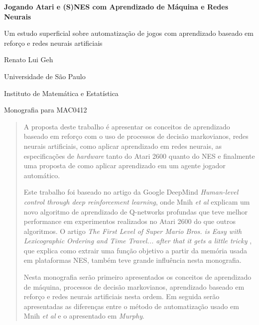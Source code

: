 \documentclass[a4paper,10pt]{article}
\theoremstyle{plain}
\begin{document}
\begin{titlepage}
  \begin{center}
    \LARGE
    \textbf{Jogando Atari e (S)NES com Aprendizado de Máquina e Redes Neurais}

    \vspace{1.7cm}
    \Large
    Um estudo superficial sobre automatização de jogos com aprendizado baseado em reforço e
    redes neurais artificiais

    \vspace{1.7cm}
    \Large
    Renato Lui Geh

    \vfill
    \Large
    Universidade de São Paulo

    Instituto de Matemática e Estatística

    Monografia para MAC0412
    \vspace{1.5cm}
  \end{center}
\end{titlepage}

\newpage
\null\vspace{\fill}
\begin{abstract}
  \large
  A proposta deste trabalho é apresentar os conceitos de aprendizado baseado em reforço com o uso
  de processos de decisão markovianos, redes neurais artificiais, como aplicar aprendizado em redes
  neurais, as especificações de \textit{hardware} tanto do Atari 2600 quanto do NES e finalmente
  uma proposta de como aplicar aprendizado em um agente jogador automático.

  Este trabalho foi baseado no artigo da Google DeepMind \textit{Human-level control through deep
  reinforcement learning}\cite{mnih-et-al}, onde Mnih \textit{et al} explicam um novo algoritmo de
  aprendizado de Q-networks profundas que teve melhor performance em experimentos realizados no
  Atari 2600 do que outros algoritmos. O artigo \textit{The First Level of Super Mario Bros. is
  Easy with Lexicographic Ordering and Time Travel... \small{after that it gets a little tricky}}
  \cite{dr-murphy}, que explica como extrair uma função objetivo a partir da memória usada em
  plataformas NES, também teve grande influência nesta monografia.

  Nesta monografia serão primeiro apresentados os conceitos de aprendizado de máquina, processos
  de decisão markovianos, aprendizado baseado em reforço e redes neurais artificiais nesta ordem.
  Em seguida serão apresentadas as diferenças entre o método de automatização usado em Mnih
  \textit{et al} e o apresentado em \textit{Murphy}.
\end{abstract}
\vspace{\fill}
\newpage
\large
\tableofcontents
\normalsize
\newpage
\end{document}
